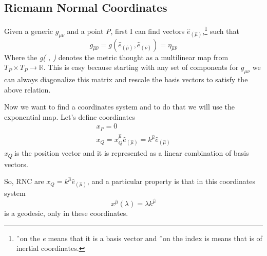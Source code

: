 
\subsection{Riemann Normal Coordinates}

Given a generic $g_{\mu \nu }$ and a point \emph{P}, first I can find vectors $\hat{e}_{\left( \hat{\mu } \right)}$,\footnote{ \^\ on the \emph{e} means that it is a basis vector and \^\ on the index is means that is of inertial coordinates.} such that
\[
g_{\hat{\mu }\hat{\nu }} =  g\left( \hat{e}_{\left( \hat{\mu } \right)}, \hat{e}_{\left( \hat{\nu } \right)} \right) = \eta _{\hat{\mu }\hat{\nu }}
\]
Where the \emph{g( , )} denotes the metric thought as a multilinear map from $T_{P} \times T_{P} \to \mathbb{R}$. This is easy because starting with any set of components for $g_{\mu \nu }$ we can always diagonalize this matrix and rescale the basis vectors to satisfy the above relation.\par
Now we want to find a coordinates system and to do that we will use the exponential map.
Let's define coordinates 
\begin{gather*}
x_{P} = 0 \\
x_{Q} = x^{\hat{\mu }}_{Q} \hat{e}_{\left( \hat{\mu } \right)} = k^{\hat{\mu }} \hat{e}_{\left( \hat{\mu } \right)}
\end{gather*}
\emph{x\textsubscript{Q}} is the position vector and it is represented as a linear combination of basis vectors.\par
So, RNC are $x_{Q } = k^{\hat{\mu} } \hat{e}_{\left( \hat{\mu } \right)}$, and a particular property is that in this coordinates system 
\[
x^{\hat{\mu }}\left( \lambda  \right) = \lambda k^{\hat{\mu }}
\]
is a geodesic, only in these coordinates.
